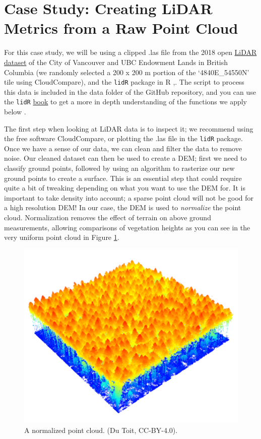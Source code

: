 \documentclass[
]{book}
\begin{document}
\hypertarget{case-study-creating-lidar-metrics-from-a-raw-point-cloud}{%
\section{Case Study: Creating LiDAR Metrics from a Raw Point Cloud}\label{case-study-creating-lidar-metrics-from-a-raw-point-cloud}}

For this case study, we will be using a clipped .las file from the 2018 open \href{https://opendata.vancouver.ca/explore/dataset/lidar-2018/information/}{LiDAR dataset} of the City of Vancouver and UBC Endowment Lands in British Columbia (we randomly selected a 200 x 200 m portion of the `4840E\_54550N' tile using CloudCompare), and the \texttt{lidR} package in R \citep{city_of_vancouver_lidar_nodate},\citep{roussel_lidr_2020}. The script to process this data is included in the data folder of the GitHub repository, and you can use the \texttt{lidR} \href{https://r-lidar.github.io/lidRbook/}{book} to get a more in depth understanding of the functions we apply below \citep{roussel_lidr_2021}.

The first step when looking at LiDAR data is to inspect it; we recommend using the free software CloudCompare, or plotting the .las file in the \texttt{lidR} package. Once we have a sense of our data, we can clean and filter the data to remove noise. Our cleaned dataset can then be used to create a DEM; first we need to classify ground points, followed by using an algorithm to rasterize our new ground points to create a surface. This is an essential step that could require quite a bit of tweaking depending on what you want to use the DEM for. It is important to take density into account; a sparse point cloud will not be good for a high resolution DEM! In our case, the DEM is used to \emph{normalize} the point cloud. Normalization removes the effect of terrain on above ground measurements, allowing comparisons of vegetation heights as you can see in the very uniform point cloud in Figure \ref{fig:15-las-normalize}.

\begin{figure}
\includegraphics[width=0.6\linewidth]{images/15-las-normalize} \caption{A normalized point cloud. (Du Toit, CC-BY-4.0).}\label{fig:15-las-normalize}
\end{figure}
\end{document}
